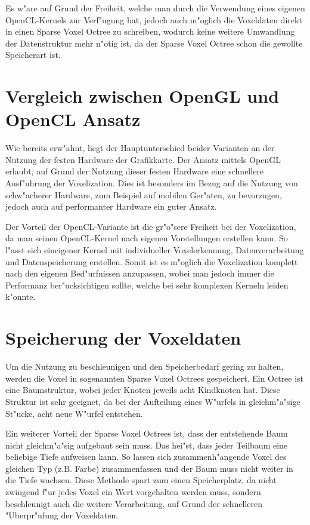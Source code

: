 \documentclass[a4paper, 12pt]{scrartcl}
\begin{document}
Es w"are auf Grund der Freiheit, welche man durch die Verwendung eines eigenen OpenCL-Kernels zur Verf"ugung hat, jedoch auch m"oglich die Voxeldaten direkt in einen Sparse Voxel Octree zu schreiben, wodurch keine weitere Umwandlung der Datenstruktur mehr n"otig ist, da der Sparse Voxel Octree schon die gewollte Speicherart ist.

\section{Vergleich zwischen OpenGL und OpenCL Ansatz}
Wie bereits erw"ahnt, liegt der Hauptunterschied beider Varianten an der Nutzung der festen Hardware der Grafikkarte. 
Der Ansatz mittels OpenGL erlaubt, auf Grund der Nutzung dieser festen Hardware eine schnellere Ausf"uhrung der Voxelization.
Dies ist besonders im Bezug auf die Nutzung von schw"acherer Hardware, zum Beispiel auf mobilen Ger"aten, zu bevorzugen, jedoch auch auf performanter Hardware ein guter Ansatz.

Der Vorteil der OpenCL-Variante ist die gr"o"sere Freiheit bei der Voxelization, da man seinen OpenCL-Kernel nach eigenen Vorstellungen erstellen kann.
So l"asst sich eineigener Kernel mit individueller Voxelerkennung, Datenverarbeitung und Datenspeicherung erstellen. 
Somit ist es m"oglich die Voxelization komplett nach den eigenen Bed"urfnissen anzupassen, wobei man jedoch immer die Performanz ber"ucksichtigen sollte, welche bei sehr komplexen Kerneln leiden k"onnte.



\section{Speicherung der Voxeldaten}
Um die Nutzung zu beschleunigen und den Speicherbedarf gering zu halten, werden die Voxel in sogenannten Sparse Voxel Octrees gespeichert. 
Ein Octree ist eine Baumstruktur, wobei jeder Knoten jeweils acht Kindknoten hat. Diese Struktur ist sehr geeignet, da bei der Aufteilung eines W"urfels in gleichm"a"sige St"ucke, acht neue W"urfel entstehen.

Ein weiterer Vorteil der Sparse Voxel Octrees ist, dass der entstehende Baum nicht gleichm"a"sig aufgebaut sein muss. 
Das hei"st, dass jeder Teilbaum eine beliebige Tiefe aufweisen kann.
So lassen sich zusammenh"angende Voxel des gleichen Typ (z.B. Farbe) zusammenfassen und der Baum muss nicht weiter in die Tiefe wachsen.
Diese Methode spart zum einen Speicherplatz, da nicht zwingend f"ur jedes Voxel ein Wert vorgehalten werden muss, sondern beschleunigt auch die weitere Verarbeitung, auf Grund der schnelleren "Uberpr"ufung der Voxeldaten.
\end{document}
